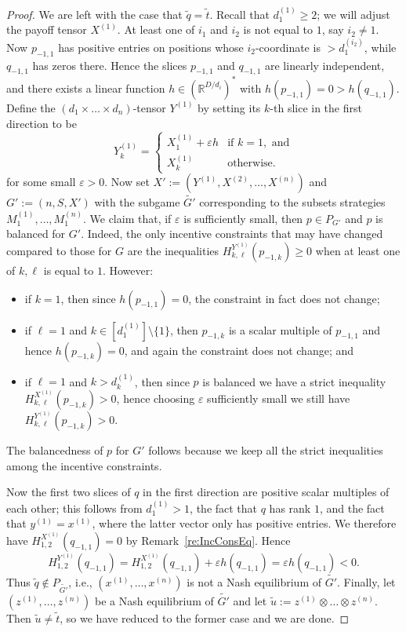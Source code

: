 \documentclass[11pt]{amsart}
\theoremstyle{definition}
\numberwithin{subcase}{case}
\renewcommand{\tilde}[1]{\widetilde{#1}}
\newcommand{\RR}{{\mathbb R}}
\begin{document}
\begin{proof}
We are left with the case that $\tilde{q} = \tilde{t}$. Recall that $d^{(1)}_1 \geq 2$; we will adjust the payoff tensor $X^{(1)}$. 
At least one of $i_1$ and $i_2$ is not equal to $1$, say $i_2 \neq 1$. Now 
$p_{-1,1}$ has positive entries on positions whose $i_2$-coordinate
is $>d^{(i_2)}_1$, while $q_{-1,1}$ has zeros there. Hence the 
slices $p_{-1,1}$ and $q_{-1,1}$ are linearly independent, and there
exists a linear function $h \in (\RR^{D/d_i})^*$ with 
$h(p_{-1,1})=0>h(q_{-1,1})$. Define the
$(d_1 \times \dots \times d_n)$-tensor $Y^{(1)}$ by setting its $k$-th slice
in the first direction to be 
\[Y^{(1)}_k= \begin{cases}
    X^{(1)}_1 + \varepsilon h & \text{if } k=1, \text{ and}\\
    X^{(1)}_k & \text{otherwise.}
\end{cases} 
\] for some small $\varepsilon>0$. Now set $X':=(Y^{(1)},X^{(2)}, \dots,
X^{(n)})$ and $G':=(n,S,X')$ with the subgame $\tilde{G'}$ corresponding
to the subsets strategies $M^{(1)}_1, \dots, M^{(n)}_1$. We claim that, if
$\varepsilon$ is sufficiently small, then $p \in P_{G'}$ and $p$ is balanced
for $G'$. Indeed, the only incentive constraints that may have changed
compared to those for $G$ are the inequalities
$H^{Y^{(1)}}_{k,\ell}(p_{-1,k})
\geq 0$ when at least one of $k,\ell$ is equal to $1$. However:
\begin{itemize} 
\item if $k=1$, then since $h(p_{-1,1})=0$,
the constraint in fact does not change; 
\item if $\ell=1$ and $k \in [d^{(1)}_1] \setminus \{1\}$, then $p_{-1,k}$ is a scalar multiple of
$p_{-1,1}$ and hence $h(p_{-1,k})=0$, and again the constraint does
not change; and 
\item if $\ell=1$ and $k>d^{(1)}_k$, then since $p$ is balanced we have
a strict inequality $H^{X^{(1)}}_{k,\ell}(p_{-1,k})>0$, hence
choosing $\varepsilon$
sufficiently small we still have $H^{Y^{(1)}}_{k,\ell}(p_{-1,k})>0$. 
\end{itemize}
The balancedness of $p$ for $G'$ follows because we keep all the
strict inequalities among the incentive constraints. 

Now the first two slices of $q$ in the first direction are positive
scalar multiples of each other; this follows from 
$d^{(1)}_1>1$, the fact that $q$
has rank $1$, and the fact that $y^{(1)}=x^{(1)}$, where the latter vector
only has positive entries. We therefore have
$H^{X^{(1)}}_{1,2}(q_{-1,1})=0$ by Remark~\ref{re:IncConsEq}. Hence
\[ H^{Y^{(1)}}_{1,2}(q_{-1,1})=H^{X^{(1)}}_{1,2}(q_{-1,1})+\varepsilon h(q_{-1,1})= \varepsilon h(q_{-1,1})<0.\] Thus $\tilde{q} \not\in P_{\tilde{G'}}$, i.e., $(x^{(1)},\dots, x^{(n)})$ is not a Nash equilibrium of $\tilde{G'}$. Finally, let $(z^{(1)}, \dots, z^{(n)})$ be a Nash equilibrium of $\tilde{G'}$ and let $\tilde{u}:=z^{(1)} \otimes \dots \otimes z^{(n)}$. Then $\tilde{u} \neq \tilde{t}$, so we have reduced to the former case and we are done.
\end{proof}
\end{document}
